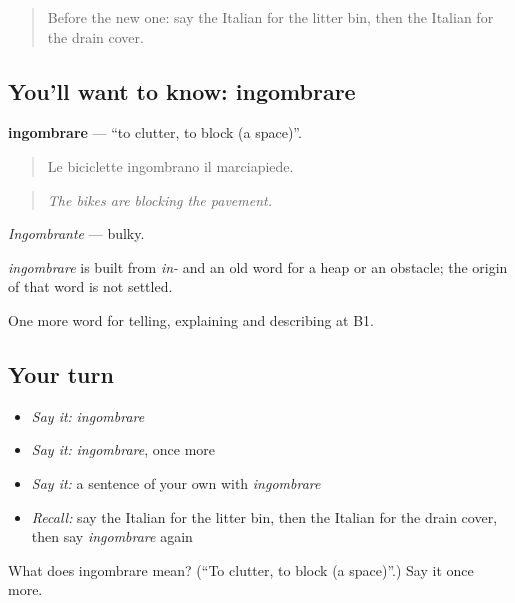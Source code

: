 \label{lesson:IT-C448-ingombrare}



\begin{quote}
Before the new one: say the Italian for the litter bin, then the Italian for the drain cover.
\end{quote}

\subsection*{You'll want to know: ingombrare}
\textbf{ingombrare} — \textquotedblleft{}to clutter, to block (a space)\textquotedblright{}.

\begin{quote}
Le biciclette ingombrano il marciapiede.
\end{quote}

\begin{quote}
\emph{The bikes are blocking the pavement.}
\end{quote}

\emph{Ingombrante} — bulky.

\begin{cousinweb}
\emph{ingombrare} is built from \emph{in-} and an old word for a heap or an obstacle; the origin of that word is not settled.
\end{cousinweb}

\begin{grammarlens}[title={What you've built}]
One more word for telling, explaining and describing at B1.
\end{grammarlens}

\subsection*{Your turn}
\begin{itemize}
\raggedright
  \item \emph{Say it:} \emph{ingombrare}
  \item \emph{Say it:} \emph{ingombrare}, once more
  \item \emph{Say it:} a sentence of your own with \emph{ingombrare}
  \item \emph{Recall:} say the Italian for the litter bin, then the Italian for the drain cover, then say \emph{ingombrare} again
\end{itemize}

\begin{tcolorbox}[breakable,colback=teal!4,colframe=teal!35!black,title={Before you move on}]
What does ingombrare mean? (\textquotedblleft{}To clutter, to block (a space)\textquotedblright{}.) Say it once more.
\end{tcolorbox}
